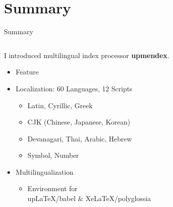 \documentclass[aspectratio=169,10pt]{beamer}
\begin{document}

\section{Summary}
\begin{frame}{Summary}

\begin{columns}
\begin{column}{70mm}

I introduced multilingual index processor \textbf{upmendex}.

  \begin{itemize}
  \item Feature\\
  \item Localization: 60 Languages, 12 Scripts
     \begin{itemize}
      \item Latin, Cyrillic, Greek
      \item CJK (Chinese, Japanese, Korean)
      \item Devanagari, Thai, Arabic, Hebrew
      \item Symbol, Number
     \end{itemize}
  \item Multilingualization
     \begin{itemize}
      \item Environment for\\
        upLaTeX/babel \& XeLaTeX/polyglossia
     \end{itemize}
  \end{itemize}
\end{column}

\begin{column}{65mm}

\begin{center}
\end{center}
\end{column}
\end{columns}

\end{frame}

\end{document}
